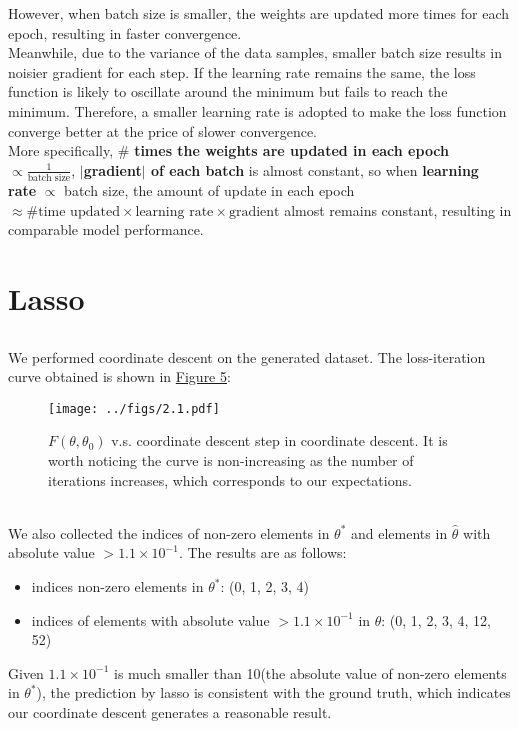 \documentclass{article}
\begin{document}
        However, when batch size is smaller, the weights are updated more times for each epoch, resulting in faster convergence.\\
        Meanwhile, due to the variance of the data samples, smaller batch size results in noisier gradient for each step.
        If the learning rate remains the same, the loss function is likely to oscillate around the minimum but fails to reach the minimum.
        Therefore, a smaller learning rate is adopted to make the loss function converge better at the price of slower convergence.\\
        More specifically, \# \textbf{times the weights are updated in each epoch} $\propto \frac{1}{\text{batch size}}$, 
        \textbf{$|$gradient$|$ of each batch} is almost constant, 
        so when \textbf{learning rate} $\propto$ batch size, 
        the amount of update in each epoch $\approx \#\text{time updated}\times\text{learning rate}\times\text{gradient}$ almost remains constant,
        resulting in comparable model performance.

    \section{Lasso}
        \subsection{}\label{2.1}
        We performed coordinate descent on the generated dataset. The loss-iteration curve obtained is shown in \hyperref[fig:2.1]{Figure 5}:
        \begin{figure}[hbt!]
            \centering
            \texttt{[image: ../figs/2.1.pdf]}
            \caption{$F(\theta, \theta_0)$ v.s. coordinate descent step in coordinate descent. 
            It is worth noticing the curve is non-increasing as the number of iterations increases, 
            which corresponds to our expectations.}
            \label{fig:2.1}
        \end{figure}\\
        We also collected the indices of non-zero elements in $\theta^{*}$ and elements in $\hat{\theta}$ with absolute value $>1.1\times 10^{-1}$.
        The results are as follows:
        \begin{itemize}
            \item indices non-zero elements in $\theta^{*}$: (0, 1, 2, 3, 4)
            \item indices of elements with absolute value $>1.1\times 10^{-1}$ in $\hat{\theta}$: (0, 1, 2, 3, 4, 12, 52)
        \end{itemize}
        Given $1.1\times 10^{-1}$ is much smaller than 10(the absolute value of non-zero elements in $\theta^{*}$),
        the prediction by lasso is consistent with the ground truth, which indicates our coordinate descent generates a reasonable result.
\end{document}
